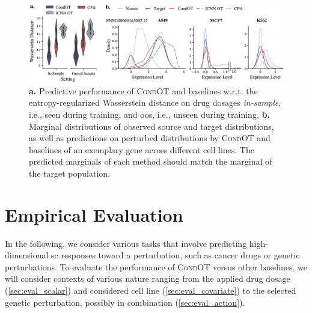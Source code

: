 \begin{figure}
    \centering
    \includegraphics[width=\textwidth]{figures/fig_sciplex_main_results.png}
    \caption{\textbf{a.}  Predictive performance of \textsc{CondOT} and baselines w.r.t. the entropy-regularized Wasserstein distance on drug dosages \emph{in-sample}, i.e., seen during training, and \acrlong{oos}, i.e., unseen during training. \textbf{b.} Marginal distributions of observed source and target distributions, as well as predictions on perturbed distributions by \textsc{CondOT} and baselines of an exemplary gene across different cell lines. The predicted marginals of each method should match the marginal of the target population.}
    \label{fig:exp_scalar_sciplex}
\end{figure}

\section{Empirical Evaluation} \label{sec:evaluation_condot}

In the following, we consider various tasks that involve predicting high-dimensional \acrlong{sc} responses toward a perturbation, such as cancer drugs or genetic perturbations. 
To evaluate the performance of \textsc{CondOT} versus other baselines, we will consider contexts of various nature ranging from the applied drug dosage (\cref{sec:eval_scalar}) and considered cell line (\cref{sec:eval_covariate}) to the selected genetic perturbation, possibly in combination (\cref{sec:eval_action}).

